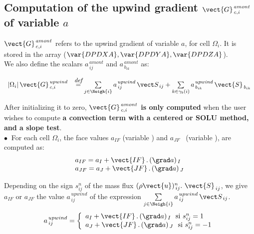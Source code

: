 \subsection*{\bf Computation of the upwind gradient $\vect{G}^{\,amont}_{\,c,i}$ of variable $a$}

$\vect{G}^{\,amont}_{\,c,i}$ refers to the upwind gradient of variable $a$, for cell $\Omega_i$. 
It is stored in the array ($\var{DPDXA}, \var{DPDYA}, \var{DPDZA}$).\\
We also define the scalars $a^{\,amont}_{\,ij}$
and $a^{\,amont}_{\,b_{ik}}$ as:

\begin{equation}\label{Base_Bilsc2_Eq_grad_decentre}
\begin{array}{ll}
|\Omega_i|\,\vect{G}^{\,upwind}_{\,c,i}&\overset{\text{\it\small def}}{=}
\sum\limits_{j\in \Neigh{i}}a^{\,upwind}_{\,ij}\,{\vect S_{\,ij}} + \sum\limits_{k\in {\gamma_b(i)}}a^{\,upwind}_{\,b_{ik}}\,\vect{S}_{\,{b}_{ik}} \\
\end{array}
\end{equation}

After initializing it to zero, {\bf $\vect{G}^{\,amont}_{\,c,i}$ is only computed} when
the user wishes to compute {\bf a convection term with a centered or SOLU method, and a slope test}.\\
$\bullet \ $ For each cell $\Omega_i$, the face values $a_{IF}$ (variable ) and $a_{JF}$~ (variable ), are computed as:\\
\begin{equation}\notag
\begin{array}{ll}
a_{IF}= a_I + \vect {IF}\,.\,(\grad a)_{\,I} \\
a_{JF}= a_J + \vect {JF}\,.\,(\grad a)_{\,J} \\
\end{array}
\end{equation}

Depending on the sign $s^n_{ij}$ of the mass flux $(\rho \vect{u})_{\,ij}^n.\ \vect{S}_{\,ij}$,
we give $a_{IF}$ or $a_{JF}$ the value $a^{\,upwind}_{\,ij}$ of the expression
 $\sum\limits_{j\in \Neigh{i}}a^{\,upwind}_{\,ij}\,{\vect S_{\,ij}}$.\\
\begin{equation}\notag
a^{\,upwind}_{\,ij}=\left\lbrace\begin{array}{l}
a_I +\vect{IF}\,.\,(\grad a)_{\,I}
\text{\ \  si } s^n_{ij} = 1\\
a_J + \vect{JF}\,.\,(\grad a)_{\,J}
\text{\ \  si } s^n_{ij} = - 1
\end{array}\right.
\end{equation}

